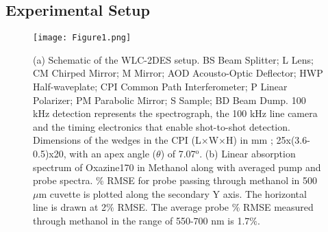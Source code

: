 \documentclass[%
aip,
amsmath,amssymb,
preprint,%
]{revtex4-2}
\begin{document}
\subsection{Experimental Setup} 

\begin{figure}[h!]
	\centering\texttt{[image: Figure1.png]}
	\caption{(a) Schematic of the WLC-2DES setup. BS Beam Splitter; L Lens; CM Chirped Mirror; M Mirror; AOD Acousto-Optic Deflector; HWP Half-waveplate; CPI Common Path Interferometer; P Linear Polarizer; PM Parabolic Mirror; S Sample; BD Beam Dump. 100 kHz detection represents the spectrograph, the 100 kHz line camera and the timing electronics that enable shot-to-shot detection. Dimensions of the wedges in the CPI (L$\times$W$\times$H) in mm ; 25x(3.6-0.5)x20, with an apex angle ($\theta$) of 7.07$^\text{{o}}$. (b) Linear absorption spectrum of Oxazine170 in Methanol along with averaged pump and probe
spectra. \% RMSE for probe passing through methanol in 500 $\mu$m cuvette is plotted along the secondary Y axis. The horizontal line is drawn at 2$\%$ RMSE. The average probe $\%$ RMSE measured through methanol in the range of 550-700 nm is 1.7$\%$. }
	\label{fig:fig1}
\end{figure}
\end{document}
